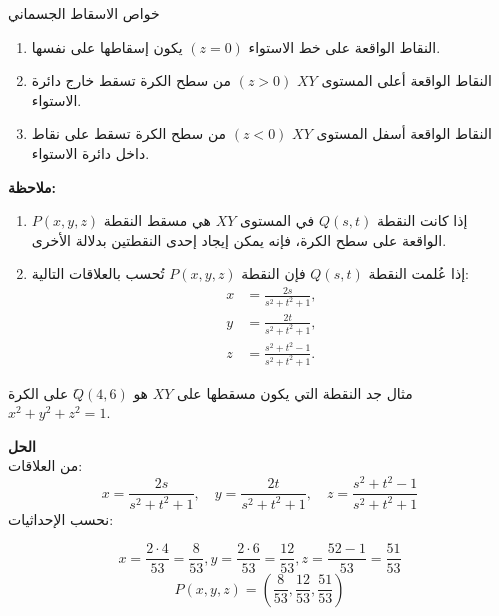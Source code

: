 		\begin{frame}{خواص الاسقاط الجسماني}
				\begin{enumerate}
					\item النقاط الواقعة على خط الاستواء \((z = 0)\) يكون إسقاطها على نفسها.
					\item النقاط الواقعة أعلى المستوى \(XY\) \((z > 0)\) من سطح الكرة تسقط خارج دائرة الاستواء.
					\item النقاط الواقعة أسفل المستوى \(XY\) \((z < 0)\) من سطح الكرة تسقط على نقاط داخل دائرة الاستواء.
				\end{enumerate}
				
				\textbf{ملاحظة:}
				\begin{enumerate}
					\item إذا كانت النقطة \(Q(s,t)\) في المستوى \(XY\) هي مسقط النقطة \(P(x,y,z)\) الواقعة على سطح الكرة، فإنه يمكن إيجاد إحدى النقطتين بدلالة الأخرى.
					\item إذا عُلمت النقطة \(Q(s,t)\) فإن النقطة \(P(x,y,z)\) تُحسب بالعلاقات التالية:
					\begin{align*}
						x &= \frac{2s}{s^2 + t^2 + 1},\\
						y &= \frac{2t}{s^2 + t^2 + 1},\\
						z &= \frac{s^2 + t^2 - 1}{s^2 + t^2 + 1}.
					\end{align*}
				\end{enumerate}
			\end{frame}
			
			\begin{frame}
				\begin{exampleblock}{مثال}
					جد النقطة التي يكون مسقطها على $XY$ هو 
					$َQ(4, 6)$ على الكرة 
					$x^2 + y^2 + z^2 = 1$.
				\end{exampleblock}
				\textbf{الحل}\\
					من العلاقات:
					\[
					x = \frac{2s}{s^2 + t^2 + 1}, \quad
					y = \frac{2t}{s^2 + t^2 + 1}, \quad
					z = \frac{s^2 + t^2 - 1}{s^2 + t^2 + 1}
					\]
					نحسب الإحداثيات:
				
					\[
					x = \frac{2 \cdot 4}{53} = \frac{8}{53}, y = \frac{2 \cdot 6}{53} = \frac{12}{53}, z = \frac{52 - 1}{53} = \frac{51}{53}
					\]
					\[
					P(x,y,z) = \left(\frac{8}{53}, \frac{12}{53}, \frac{51}{53}\right)
					\]
				
			\end{frame}
			
